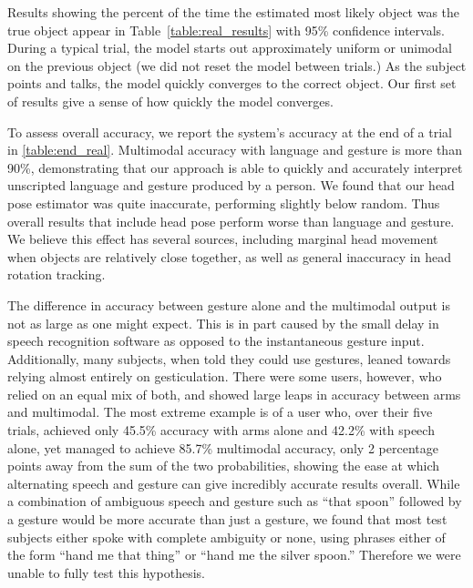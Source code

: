 \documentclass[letterpaper, 10 pt, conference]{ieeeconf}
\begin{document}
Results showing the percent of the time the estimated most likely
object was the true object appear in Table~\ref{table:real_results}
with 95\% confidence intervals.  During a typical trial, the model
starts out approximately uniform or unimodal on the previous object
(we did not reset the model between trials.) As the subject points and
talks, the model quickly converges to the correct object.  Our first
set of results give a sense of how quickly the model converges.

To assess overall accuracy, we report the system's accuracy at the end
of a trial in \ref{table:end_real}.  Multimodal accuracy with language
and gesture is more than 90\%, demonstrating that our approach is able
to quickly and accurately interpret unscripted language and gesture
produced by a person.  We found that our head pose estimator was quite
inaccurate, performing slightly below random.  Thus overall
results that include head pose perform worse than language and
gesture.  We believe this effect has several sources, including marginal head movement when objects are relatively close together, as well as general inaccuracy in head rotation tracking. 

The difference in accuracy between gesture alone and the multimodal
output is not as large as one might expect. This is in part caused by
the small delay in speech recognition software as opposed to the
instantaneous gesture input. Additionally, many subjects, when told
they could use gestures, leaned towards relying almost entirely on
gesticulation. There were some users, however, who relied on an equal
mix of both, and showed large leaps in accuracy between arms and
multimodal. The most extreme example is of a user who, over their five
trials, achieved only 45.5\% accuracy with arms alone and 42.2\% with
speech alone, yet managed to achieve 85.7\% multimodal accuracy, only
2 percentage points away from the sum of the two probabilities,
showing the ease at which alternating speech and gesture can give
incredibly accurate results overall. While a combination of ambiguous
speech and gesture such as ``that spoon'' followed by a gesture would
be more accurate than just a gesture, we found that most test subjects
either spoke with complete ambiguity or none, using phrases either of
the form ``hand me that thing'' or ``hand me the silver spoon.''
Therefore we were unable to fully test this hypothesis.
\end{document}

